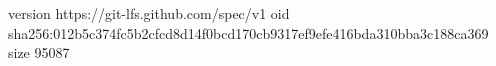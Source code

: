version https://git-lfs.github.com/spec/v1
oid sha256:012b5c374fc5b2cfcd8d14f0bcd170cb9317ef9efe416bda310bba3c188ca369
size 95087
